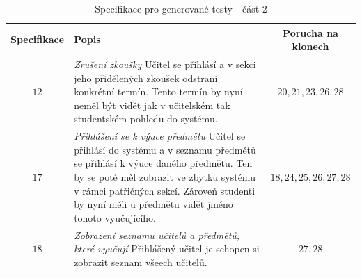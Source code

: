 \documentclass[czech, ma, kiv, he, iso690alph, pdf, viewonly]{fasthesis}
\begin{document}
    \begin{table}
        \begin{tabular}{|c|p{7cm}|c|}
            \hline
            \textbf{Specifikace} & \textbf{Popis} & \textbf{Porucha na klonech} \\
            \hline
            \(12\) & \textit{Zrušení zkoušky} \newline Učitel se přihlásí a v sekci jeho přidělených zkoušek odstraní konkrétní termín. Tento termín by nyní neměl být vidět jak v učitelském tak studentském pohledu do systému. & \(20, 21, 23, 26, 28\) \\
            \hline
            \(17\) & \textit{Přihlášení se k výuce předmětu} \newline Učitel se přihlásí do systému a v seznamu předmětů se přihlásí k výuce daného předmětu. Ten by se poté měl zobrazit ve zbytku systému v rámci patřičných sekcí. Zároveň studenti by nyní měli u předmětu vidět jméno tohoto vyučujícího. & \(18, 24, 25, 26, 27, 28\) \\
            \hline
            \(18\) & \textit{Zobrazení seznamu učitelů a předmětů, které vyučují} \newline Přihlášený učitel je schopen si zobrazit seznam všeech učitelů. & \(27, 28\) \\
            \hline
        \end{tabular}
        \centering
        \label{tab:specs_2}
        \caption{Specifikace pro generované testy - část 2}
    \end{table}
\end{document}
